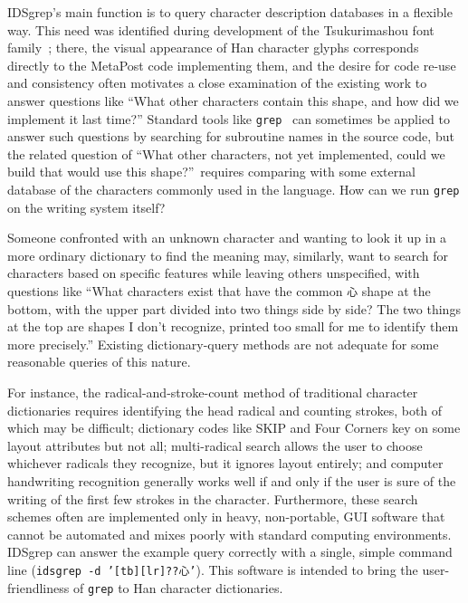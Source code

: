 \documentclass[twocolumn]{report}
\begin{document}
IDSgrep's main function is to query character description databases in a
flexible way.  This need was identified during development of the
Tsukurimashou font family~\cite{Tsukurimashou}; there, the visual appearance
of Han character glyphs corresponds directly to the MetaPost code
implementing them, and the desire for code re-use and consistency often
motivates a close examination of the existing work to answer questions like
``What other characters contain this shape, and how did we implement it last
time?'' Standard tools like \texttt{grep}~\cite{grep} can sometimes be
applied to answer such questions by searching for subroutine names in the
source code, but the related question of ``What other characters, not yet
implemented, could we build that would use this shape?''\ requires comparing
with some external database of the characters commonly used in the language. 
How can we run \texttt{grep} on the writing system itself?

Someone confronted with an unknown character and wanting to look it up in a
more ordinary dictionary to find the meaning may, similarly, want to search
for characters based on specific features while leaving others unspecified,
with questions like ``What characters exist that have the common \texttt{心}
shape at the bottom, with the upper part divided into two things side by
side?  The two things at the top are shapes I don't recognize, printed too
small for me to identify them more precisely.'' Existing dictionary-query
methods are not adequate for some reasonable queries of this nature.

For instance, the radical-and-stroke-count method of traditional character
dictionaries requires identifying the head radical and counting strokes,
both of which may be difficult; dictionary codes like SKIP and Four Corners
key on some layout attributes but not all; multi-radical search allows the
user to choose whichever radicals they recognize, but it ignores layout
entirely; and computer handwriting recognition generally works well if and
only if the user is sure of the writing of the first few strokes in the
character.  Furthermore, these search schemes often are implemented only in
heavy, non-portable, GUI software that cannot be automated and mixes poorly
with standard computing environments.  IDSgrep can answer the example query
correctly with a single, simple command line (\texttt{idsgrep -d
'[tb][lr]??心'}).  This software is intended to bring the user-friendliness
of \texttt{grep} to Han character dictionaries.

\end{document}
